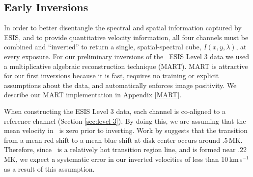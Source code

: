 \documentclass[linenumbers,trackchanges]{aastex63}
\begin{document}
    
    
    \subsection{Early Inversions} \label{sec:inversions}
    	In order to better disentangle the spectral and spatial information captured by ESIS, and to provide quantitative velocity information, all four channels must be combined and ``inverted'' to return a single, spatial-spectral cube, $I(x,y,\lambda)$, at every exposure.
    	For our preliminary inversions of the \ov \  ESIS Level 3 data we used a multiplicative algebraic reconstruction technique (MART).
    	MART is attractive for our first inversions because it is fast, requires no training or explicit assumptions about the data, and automatically enforces image  positivity.
    	We describe our MART implementation in Appendix \ref{MART}.
    	
    	When constructing the ESIS Level 3 data, each channel is co-aligned to a reference channel (Section \ref{sec:level 3}).
    	By doing this, we are assuming that the mean velocity in \ov \ is zero prior to inverting.
    	Work by \citet{Peter1999} suggests that the transition from a mean red shift to a mean blue shift at disk center occurs around .5\,MK.
    	Therefore, since \ov \ is a relatively hot transition region line, and is formed near .22\,MK, we expect a systematic error in our inverted velocities of less than 10\,km\,s$^{-1}$ as a result of this assumption.
    	 
\end{document}
